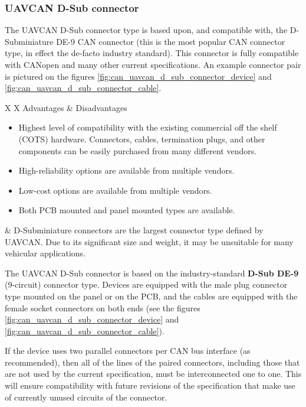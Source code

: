 \clearpage  %
\subsubsection{UAVCAN D-Sub connector}

The UAVCAN D-Sub connector type is based upon, and compatible with, the D-Subminiature DE-9 CAN connector
(this is the most popular CAN connector type, in effect the de-facto industry standard).
This connector is fully compatible with CANopen and many other current specifications.
An example connector pair is pictured on the figures \ref{fig:can_uavcan_d_sub_connector_device}
and \ref{fig:can_uavcan_d_sub_connector_cable}.

{
\NoLeftSkip
\begin{UAVCANCompactTable}{X X}
    Advantages & Disadvantages \\
    \begin{itemize}
        \item Highest level of compatibility with the existing commercial off the shelf (COTS) hardware.
        Connectors, cables, termination plugs, and other components can be easily purchased from many different vendors.
        \item High-reliability options are available from multiple vendors.
        \item Low-cost options are available from multiple vendors.
        \item Both PCB mounted and panel mounted types are available.
    \end{itemize}
    &
    D-Subminiature connectors are the largest connector type defined by UAVCAN.
    Due to its significant size and weight, it may be unsuitable for many vehicular applications.
\end{UAVCANCompactTable}
}

The UAVCAN D-Sub connector is based on the industry-standard \textbf{D-Sub DE-9} (9-circuit) connector type.
Devices are equipped with the male plug connector type mounted on the panel or on the PCB,
and the cables are equipped with the female socket connectors on both ends
(see the figures \ref{fig:can_uavcan_d_sub_connector_device} and \ref{fig:can_uavcan_d_sub_connector_cable}).

If the device uses two parallel connectors per CAN bus interface (as recommended),
then all of the lines of the paired connectors,
including those that are not used by the current specification,
must be interconnected one to one.
This will ensure compatibility with future revisions of the specification that make use of
currently unused circuits of the connector.

